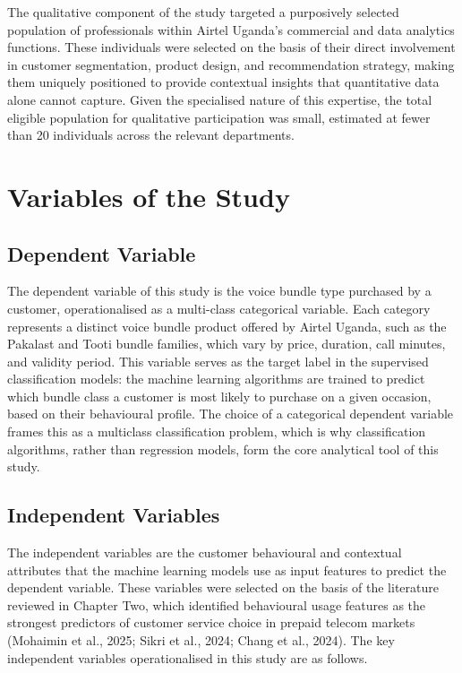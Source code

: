 The qualitative component of the study targeted a purposively selected population of professionals within Airtel Uganda's commercial and data analytics functions. These individuals were selected on the basis of their direct involvement in customer segmentation, product design, and recommendation strategy, making them uniquely positioned to provide contextual insights that quantitative data alone cannot capture. Given the specialised nature of this expertise, the total eligible population for qualitative participation was small, estimated at fewer than 20 individuals across the relevant departments.


\section{Variables of the Study}


\subsection{Dependent Variable}

The dependent variable of this study is the voice bundle type purchased by a customer, operationalised as a multi-class categorical variable. Each category represents a distinct voice bundle product offered by Airtel Uganda, such as the Pakalast and Tooti bundle families, which vary by price, duration, call minutes, and validity period. This variable serves as the target label in the supervised classification models: the machine learning algorithms are trained to predict which bundle class a customer is most likely to purchase on a given occasion, based on their behavioural profile. The choice of a categorical dependent variable frames this as a multiclass classification problem, which is why classification algorithms, rather than regression models, form the core analytical tool of this study.


\subsection{Independent Variables}

The independent variables are the customer behavioural and contextual attributes that the machine learning models use as input features to predict the dependent variable. These variables were selected on the basis of the literature reviewed in Chapter Two, which identified behavioural usage features as the strongest predictors of customer service choice in prepaid telecom markets (Mohaimin et al., 2025; Sikri et al., 2024; Chang et al., 2024). The key independent variables operationalised in this study are as follows.

